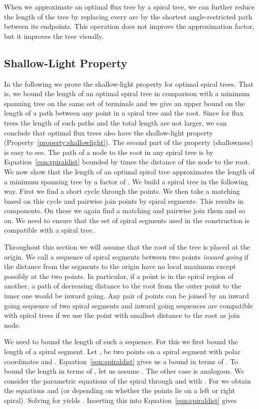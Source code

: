 \documentclass{journalA4}
\begin{document}
When we approximate an optimal flux tree by a spiral tree, we can further reduce the length of the tree by replacing every arc by the shortest angle-restricted path between its endpoints.
This operation does not improve the approximation factor, but it improves the tree visually.

\subsection{Shallow-Light Property}\label{sec:shallowlight}
In the following we prove the shallow-light property for optimal spiral trees. That is, we bound the length of an optimal spiral tree in comparison with a minimum spanning tree on the same set of terminals and we give an upper bound on the length of a path between any point in a spiral tree and the root. Since for flux trees the length of such paths and the total length are not larger, we can conclude that optimal flux trees also have the shallow-light property (Property~\ref{property:shallowlight}).
The second part of the property (shallowness) is easy to see.
The path of a node to the root in any spiral tree is by Equation~\ref{eqn:spiraldist}
bounded by  times the distance of the node to the root. 
We now show that the length of an optimal spiral tree approximates the length of a minimum spanning tree by a factor of . We build a spiral tree in the following way.
 First we find a short cycle through the points. We then take a matching based on this cycle and pairwise join points by spiral segments. This results in  components. On these we again find a matching and pairwise join them and so on. We need to ensure that the set of spiral segments used in the construction is compatible with a spiral tree.

 Throughout this section we will assume that the root of the tree is placed at the origin. We call a sequence of spiral segments between two points \emph{inward going} if the distance from the segments to the origin have no local maximum except possibly at the two points. In particular, if a point is in the spiral region of another, a path of decreasing distance to the root from the outer point to the inner one would be inward going. Any pair of points can be joined by an inward going sequence of two spiral segments and inward going sequences are compatible with spiral trees if we use the point with smallest distance to the root as join node.

We need to bound the length of such a sequence. For this we first bound the length of a spiral segment. Let ,  be two points on a spiral segment with polar coordinates  and . Equation~\ref{eqn:spiraldist} gives us a bound in terms of . To bound the length in terms of , let us assume . The other case is analogous. We consider the parametric equations of the spiral through  and  with . For  we obtain the equations  and  (or  depending on whether the points lie on a left or right spiral). Solving for  yields
.
Inserting this into Equation~\ref{eqn:spiraldist} gives
\end{document}

